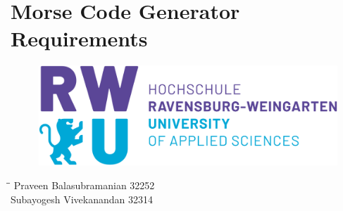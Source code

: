 \documentclass[12pt,a4paper, landscape]{article}
\begin{document}
\newpage
\pagestyle{fancy}
\fancyfoot{}
\fancyhead{}

\setlength{\footskip=0pt}
\setlength{\headheight=35pt}

\newpage


\section*{Morse Code Generator Requirements}

\vspace*{2cm}

\begin{figure}[H]
\centering
\includegraphics[scale=0.3]{1.png}
\label{Required.jpg}
\end{figure}
\begin{center}
\parbox{0pt}{
\begin{tabbing}
\hspace{1cm}\=\hspace{9.5cm}\=\kill
  \> Praveen Balasubramanian 32252   \>  \\
  \> Subayogesh Vivekanandan 32314 \>   \\ \\
\end{tabbing} }
\end{center}
\end{document}

